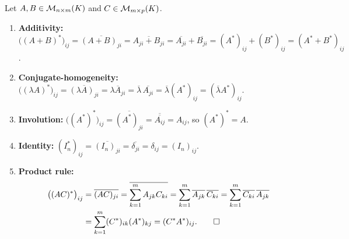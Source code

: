 \begin{exercisesolution}
\label{sol:properties_adjoint_matrix_rules}
Let $A, B \in \mathcal{M}_{n \times m}(K)$ and $C \in \mathcal{M}_{m \times p}(K)$.
\begin{enumerate}[label=\textbf{(\alph*)}]
    \item \textbf{Additivity:}
    $\big((A + B)^*\big)_{ij} = \overline{(A + B)_{ji}} = \overline{A_{ji} + B_{ji}} = \overline{A_{ji}} + \overline{B_{ji}} = (A^*)_{ij} + (B^*)_{ij} = (A^* + B^*)_{ij}$.

    \item \textbf{Conjugate-homogeneity:}
    $\big((\lambda A)^*\big)_{ij} = \overline{(\lambda A)_{ji}} = \overline{\lambda A_{ji}} = \overline{\lambda} \, \overline{A_{ji}} = \overline{\lambda} (A^*)_{ij} = (\overline{\lambda} A^*)_{ij}$.

    \item \textbf{Involution:}
    $\big((A^*)^*\big)_{ij} = \overline{(A^*)_{ji}} = \overline{\overline{A_{ij}}} = A_{ij}$, so $(A^*)^* = A$.

    \item \textbf{Identity:}
    $(I_n^*)_{ij} = \overline{(I_n)_{ji}} = \overline{\delta_{ji}} = \delta_{ij} = (I_n)_{ij}$.

    \item \textbf{Product rule:}
    \begin{align*}
    \big((A C)^*\big)_{ij} &= \overline{(A C)_{ji}} = \overline{\sum_{k=1}^m A_{jk} C_{ki}} = \sum_{k=1}^m \overline{A_{jk}} \, \overline{C_{ki}} = \sum_{k=1}^m \overline{C_{ki}} \, \overline{A_{jk}} \\
    &= \sum_{k=1}^m (C^*)_{ik} (A^*)_{kj} = (C^* A^*)_{ij}. \qedhere
    \end{align*}
\end{enumerate}
\end{exercisesolution}

